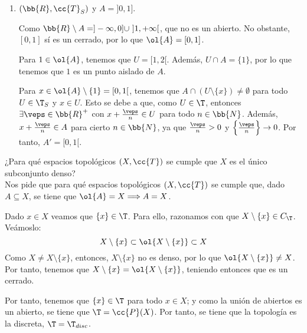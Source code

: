 \begin{ejercicio}
\begin{enumerate}
        Por tanto, tenemos que $A\cap U=A\cap [(X\setminus A)\cup \{x\}] = \{x\}$. Por tanto, tenemos que $x$ es un punto aislado de $A$. Es decir, todos los puntos de $A$ son aislados.

        Sea ahora $x\in X$, y veamos si es un punto de acumulación. Como todos los puntos de $A$ son aislados, tenemos que $x\notin A$. Además, como $A$ es finito, tenemos que $X\setminus A\in \T_{CF}$. Entonces:
        \begin{equation*}
            A\cap ((X\setminus A)\setminus \{x\})
            = A\cap (X\setminus (A\cup \{x\})) = \emptyset
        \end{equation*}
        
        Entonces, $x\notin A'$, y por tanto $A'=\emptyset$.
        
        
        \item $(\bb{R}, \cc{T}_S)$ y $A=]0,1]$.

        Como $\bb{R}\setminus A = ]-\infty, 0]\cup~]1,+\infty[$, que no es un abierto. No obstante, $[0,1]$ sí es un cerrado, por lo que $\ol{A}=[0,1]$.

        Para $1\in \ol{A}$, tenemos que $U=[1,2[$. Además, $U\cap A=\{1\}$, por lo que tenemos que $1$ es un punto aislado de $A$.

        Para $x\in \ol{A}\setminus \{1\}=[0,1[$, tenemos que $A\cap (U\setminus \{x\})\neq \emptyset$ para todo $U\in \T_S$ y $x\in U$. Esto se debe a que, como $U\in \T$, entonces $\exists \veps\in \bb{R}^+$ con $x+\frac{\veps}{n}\in U$ para todo $n\in \bb{N}$. Además, $x+\frac{\veps}{n}\in A$ para cierto $n\in \bb{N}$, ya que $\frac{\veps}{n}>0$ y $\left\{\frac{\veps}{n}\right\}\to 0$. Por tanto, $A'=[0,1[$.

        
    \end{enumerate}
\end{ejercicio}

\begin{ejercicio}
    ¿Para qué espacios topológicos $(X,\cc{T})$ se cumple que $X$ es el único subconjunto denso?\\

    Nos pide que para qué espacios topológicos $(X,\cc{T})$ se cumple que, dado $A\subseteq X$, se tiene que $\ol{A}=X\Longrightarrow A=X$.

    Dado $x\in X$ veamos que $\{x\}\in \T$. Para ello, razonamos con que ${X}\setminus \{x\}\in C_\T$. Veámoslo:
    \begin{equation*}
        X\setminus \{x\} \subset \ol{X\setminus \{x\}} \subset X
    \end{equation*}
    Como $X\neq X\setminus \{x\}$, entonces, $X\setminus \{x\}$ no es denso, por lo que $\ol{X\setminus \{x\}}\neq X$. Por tanto, tenemos que $X\setminus \{x\}=\ol{X\setminus \{x\}}$, teniendo entonces que es un cerrado. 

    Por tanto, tenemos que $\{x\}\in \T$ para todo $x\in X$; y como la unión de abiertos es un abierto, se tiene que $\T=\cc{P}(X)$. Por tanto, se tiene que la topología es la discreta, $\T=\T_{disc}$.
\end{ejercicio}

